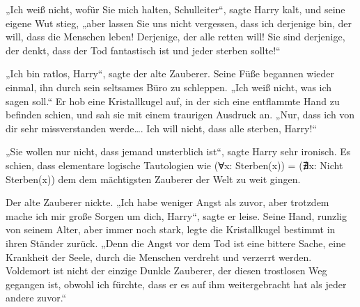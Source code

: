 „Ich weiß nicht, wofür Sie mich halten, Schulleiter“, sagte Harry kalt, und seine eigene Wut stieg, „aber lassen Sie uns nicht vergessen, dass ich derjenige bin, der will, dass die Menschen leben! Derjenige, der alle retten will! Sie sind derjenige, der denkt, dass der Tod fantastisch ist und jeder sterben sollte!“

„Ich bin ratlos, Harry“, sagte der alte Zauberer. Seine Füße begannen wieder einmal, ihn durch sein seltsames Büro zu schleppen. „Ich weiß nicht, was ich sagen soll.“ Er hob eine Kristallkugel auf, in der sich eine entflammte Hand zu befinden schien, und sah sie mit einem traurigen Ausdruck an. „Nur, dass ich von dir sehr missverstanden werde…. Ich will nicht, dass alle sterben, Harry!“

„Sie wollen nur nicht, dass jemand unsterblich ist“, sagte Harry sehr ironisch. Es schien, dass elementare logische Tautologien wie (Ɐx: Sterben(x)) = (∄x: Nicht Sterben(x)) dem dem mächtigsten Zauberer der Welt zu weit gingen.%

Der alte Zauberer nickte. „Ich habe weniger Angst als zuvor, aber trotzdem mache ich mir große Sorgen um dich, Harry“, sagte er leise. Seine Hand, runzlig von seinem Alter, aber immer noch stark, legte die Kristallkugel bestimmt in ihren Ständer zurück. „Denn die Angst vor dem Tod ist eine bittere Sache, eine Krankheit der Seele, durch die Menschen verdreht und verzerrt werden. Voldemort ist nicht der einzige Dunkle Zauberer, der diesen trostlosen Weg gegangen ist, obwohl ich fürchte, dass er es auf ihm weitergebracht hat als jeder andere zuvor.“

